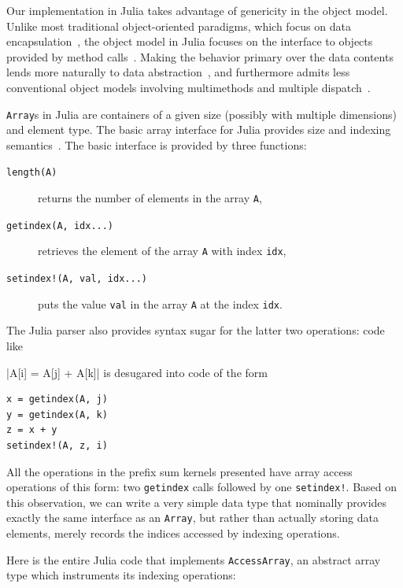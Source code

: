 \documentclass{sig-alternate}
\newcommand{\code}[1]{\texttt{#1}}
\begin{document}
Our implementation in Julia takes advantage of genericity in the object model.
Unlike most traditional object-oriented paradigms, which focus on data
encapsulation~\cite{Cardelli1985}, the object model in Julia focuses on the
interface to objects provided by method calls~\cite{Mitchell1988}. Making the
behavior primary over the data contents lends more naturally to data
abstraction~\cite{Mitchell1988,Abadi1996}, and furthermore admits less conventional
object models involving multimethods and multiple dispatch~\cite{Castagna1997}.

\code{Array}s in Julia are containers of a given size (possibly with multiple
dimensions) and element type. The basic array interface for Julia provides size
and indexing semantics~\cite{Bezanson2014}. The basic interface is provided by
three functions:

\begin{description}
	\item[\code{length(A)}] returns the number of elements in the array
	      \code{A},
      	\item[\code{getindex(A, idx...)}] retrieves the element of the array
	      \code{A} with index \code{idx},
      	\item[\code{setindex!(A, val, idx...)}] puts the value \code{val} in
	      the array \code{A} at the index \code{idx}.
\end{description}

The Julia parser also provides syntax sugar for the latter two operations: code
like

|A[i] = A[j] + A[k]|
%
is desugared into code of the form

\begin{verbatim}
x = getindex(A, j)
y = getindex(A, k)
z = x + y
setindex!(A, z, i)
\end{verbatim}

All the operations in the prefix sum kernels presented have array access
operations of this form: two \code{getindex} calls followed by one
\code{setindex!}. Based on this observation, we can write a very simple data
type that nominally provides exactly the same interface as an \code{Array}, but
rather than actually storing data elements, merely records the indices accessed
by indexing operations.

Here is the entire Julia code that implements \code{AccessArray}, an abstract
array type which instruments its indexing operations:
\end{document}
